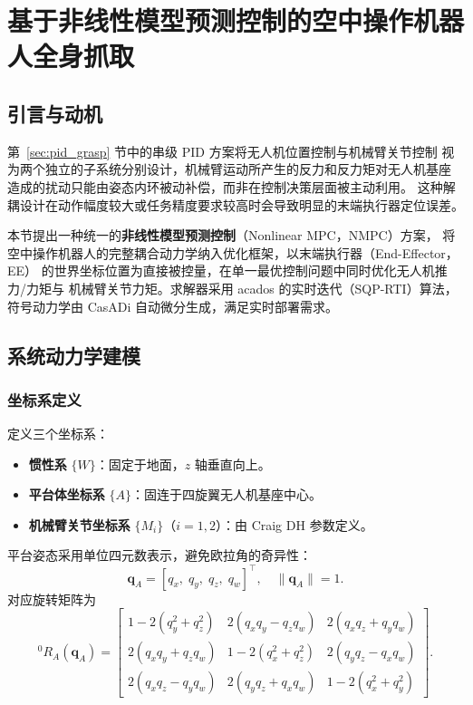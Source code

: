 
\section{基于非线性模型预测控制的空中操作机器人全身抓取}
\label{sec:nmpc_grasp}

\subsection{引言与动机}

第~\ref{sec:pid_grasp} 节中的串级 PID 方案将无人机位置控制与机械臂关节控制
视为两个独立的子系统分别设计，机械臂运动所产生的反力和反力矩对无人机基座
造成的扰动只能由姿态内环被动补偿，而非在控制决策层面被主动利用。
这种解耦设计在动作幅度较大或任务精度要求较高时会导致明显的末端执行器定位误差。

本节提出一种统一的\textbf{非线性模型预测控制}（Nonlinear MPC，NMPC）方案，
将空中操作机器人的完整耦合动力学纳入优化框架，以末端执行器（End-Effector，EE）
的世界坐标位置为直接被控量，在单一最优控制问题中同时优化无人机推力/力矩与
机械臂关节力矩。求解器采用 acados 的实时迭代（SQP-RTI）算法，
符号动力学由 CasADi 自动微分生成，满足实时部署需求。

\subsection{系统动力学建模}

\subsubsection{坐标系定义}

定义三个坐标系：
\begin{itemize}
    \item \textbf{惯性系} $\{W\}$：固定于地面，$z$ 轴垂直向上。
    \item \textbf{平台体坐标系} $\{A\}$：固连于四旋翼无人机基座中心。
    \item \textbf{机械臂关节坐标系} $\{M_i\}$（$i=1,2$）：由 Craig DH 参数定义。
\end{itemize}

平台姿态采用单位四元数表示，避免欧拉角的奇异性：
\begin{equation}
    \mathbf{q}_A = [q_x,\; q_y,\; q_z,\; q_w]^\top, \quad \|\mathbf{q}_A\| = 1.
\end{equation}
对应旋转矩阵为
\begin{equation}
    {}^{0}\!R_A(\mathbf{q}_A) =
    \begin{bmatrix}
        1 - 2(q_y^2+q_z^2) & 2(q_xq_y - q_zq_w) & 2(q_xq_z + q_yq_w) \\
        2(q_xq_y + q_zq_w) & 1 - 2(q_x^2+q_z^2) & 2(q_yq_z - q_xq_w) \\
        2(q_xq_z - q_yq_w) & 2(q_yq_z + q_xq_w) & 1 - 2(q_x^2+q_y^2)
    \end{bmatrix}.
    \label{eq:rotmat}
\end{equation}

